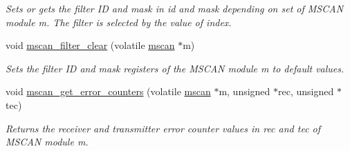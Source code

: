 \begin{DoxyCompactItemize}
\begin{DoxyCompactList}\small\item\em Sets or gets the filter ID and mask in {\itshape id} and {\itshape mask} depending on {\itshape set} of M\+S\+C\+AN module {\itshape m}. The filter is selected by the value of {\itshape index}. \end{DoxyCompactList}\item 
\mbox{\label{group__RTEMSBSPsPowerPCGen5200MSCAN_gaea10ec6ee1163bdb33ff13b21332dfd7}} 
void \mbox{\hyperlink{group__RTEMSBSPsPowerPCGen5200MSCAN_gaea10ec6ee1163bdb33ff13b21332dfd7}{mscan\+\_\+filter\+\_\+clear}} (volatile \mbox{\hyperlink{group__RTEMSBSPsPowerPCGen5200MSCAN_gacfd56a4a482c5e7da2cff003284b2d51}{mscan}} $\ast$m)
\begin{DoxyCompactList}\small\item\em Sets the filter ID and mask registers of the M\+S\+C\+AN module {\itshape m} to default values. \end{DoxyCompactList}\item 
\mbox{\label{group__RTEMSBSPsPowerPCGen5200MSCAN_ga0f5f444e543a0629b59ee4e286ee30d8}} 
void \mbox{\hyperlink{group__RTEMSBSPsPowerPCGen5200MSCAN_ga0f5f444e543a0629b59ee4e286ee30d8}{mscan\+\_\+get\+\_\+error\+\_\+counters}} (volatile \mbox{\hyperlink{group__RTEMSBSPsPowerPCGen5200MSCAN_gacfd56a4a482c5e7da2cff003284b2d51}{mscan}} $\ast$m, unsigned $\ast$rec, unsigned $\ast$tec)
\begin{DoxyCompactList}\small\item\em Returns the receiver and transmitter error counter values in {\itshape rec} and {\itshape tec} of M\+S\+C\+AN module {\itshape m}. \end{DoxyCompactList}\end{DoxyCompactItemize}
